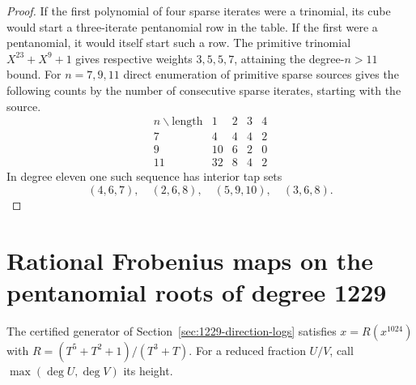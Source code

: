 \documentclass[11pt]{article}
\begin{document}
\begin{proof}
If the first polynomial of four sparse iterates were a trinomial,
its cube would start a three-iterate pentanomial row in the table.
If the first were a pentanomial, it would itself start such a row.
The primitive trinomial \(X^{23}+X^9+1\) gives respective weights
\(3,5,5,7\), attaining the degree-\(n>11\) bound. For \(n=7,9,11\)
direct enumeration of primitive sparse sources gives the following
counts by the number of consecutive sparse iterates, starting with
the source.
\[
\begin{array}{c|rrrr}
 n\backslash\text{length}&1&2&3&4\\\hline
 7&4&4&4&2\\9&10&6&2&0\\11&32&8&4&2
\end{array}
\]
In degree eleven one such sequence has interior tap sets
\[
 (4,6,7),\quad(2,6,8),\quad(5,9,10),\quad(3,6,8).
\]
\end{proof}

\section{Rational Frobenius maps on the pentanomial roots of degree 1229}
\label{sec:sparse-frobenius-height}
The certified generator of Section~\ref{sec:1229-direction-logs} satisfies
\(x=R(x^{1024})\) with \(R=(T^5+T^2+1)/(T^3+T)\). For a reduced
fraction \(U/V\), call \(\max(\deg U,\deg V)\) its height.
\end{document}
